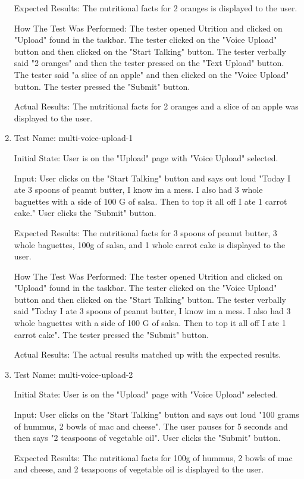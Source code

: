 \documentclass[12pt, titlepage]{article}
\begin{document}
\begin{enumerate}
		Expected Results: The nutritional facts for 2 oranges is displayed to the user.
		
		How The Test Was Performed: The tester opened Utrition and clicked on "Upload" found in the taskbar. The tester clicked on the "Voice Upload" button and then clicked on the "Start Talking" button. The tester verbally said "2 oranges" and then the tester pressed on the "Text Upload" button. The tester said "a slice of an apple" and then clicked on the "Voice Upload" button. The tester pressed the "Submit" button.
		
		Actual Results: The nutritional facts for 2 oranges and a slice of an apple was displayed to the user.
		
		\item{Test Name: multi-voice-upload-1}
		
		Initial State: User is on the "Upload" page with "Voice Upload" selected.
		
		Input: User clicks on the "Start Talking" button and says out loud "Today I ate 3 spoons of peanut butter, I know im a mess. I also had 3 whole baguettes with a side of 100 G of salsa. Then to top it all off I ate 1 carrot cake." User clicks the "Submit" button.
		
		Expected Results: The nutritional facts for 3 spoons of peanut butter, 3 whole baguettes, 100g of salsa, and 1 whole carrot cake is displayed to the user.
		
		How The Test Was Performed: The tester opened Utrition and clicked on "Upload" found in the taskbar. The tester clicked on the "Voice Upload" button and then clicked on the "Start Talking" button. The tester verbally said "Today I ate 3 spoons of peanut butter, I know im a mess. I also had 3 whole baguettes with a side of 100 G of salsa. Then to top it all off I ate 1 carrot cake". The tester pressed the "Submit" button.
		
		Actual Results: The actual results matched up with the expected results.
		
		\item{Test Name: multi-voice-upload-2}
		
		Initial State: User is on the "Upload" page with "Voice Upload" selected.
		
		Input: User clicks on the "Start Talking" button and says out loud "100 grams of hummus, 2 bowls of mac and cheese". The user pauses for 5 seconds and then says "2 teaspoons of vegetable oil". User clicks the "Submit" button.
		
		Expected Results: The nutritional facts for 100g of hummus, 2 bowls of mac and cheese, and 2 teaspoons of vegetable oil is displayed to the user.
		

\end{enumerate}
\end{document}
